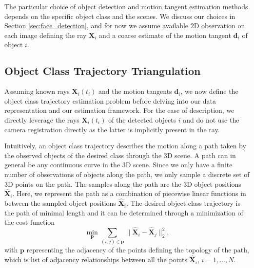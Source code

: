 The particular choice of object detection and motion tangent estimation methods depends on the specific object class and the scenes.
We discuss our choices in Section \ref{sec:face_detection}, and for now we assume available 2D observation on each image defining the ray $\mathbf{X}_i$ and a coarse estimate of the motion tangent $\mathbf{d}_i$ of object $i$.



\subsection{Object Class Trajectory Triangulation}
\label{sec:problem}
Assuming known rays $\mathbf{X}_i(t_i)$ and the motion tangents $\mathbf{d}_{i}$, we now define the object class trajectory estimation problem before delving into our data representation and our estimation framework. For the ease of description, we directly leverage the rays $\mathbf{X}_i(t_i)$ of the detected objects $i$ and do not use the camera registration directly as the latter is implicitly present in the ray.

Intuitively, an object class trajectory describes the motion along a path taken by the observed objects of the desired class through the 3D scene. A path can in general be any continuous curve in the 3D scene. Since we only have a finite number of observations of objects along the path, we only sample a discrete set of 3D points on the path. The samples along the path are the 3D object positions $\mathbf{\hat{X}}_i$. Here, we represent the path as a combination of piecewise linear functions in between the sampled object positions $\mathbf{\hat{X}}_i$.
The desired object class trajectory is the path of minimal length and it can be determined through a minimization of the cost function
\begin{equation}
\label{eq:pathsimple}
\underset{\mathbf{p}} { \min  }\sum_{(i,j)\in\mathbf{p}}{\|\mathbf{\hat{X}}_i-\mathbf{\hat{X}}_j\|_2^2},
\end{equation}
with $\mathbf{p}$ representing the adjacency of the points defining the topology of the path, which is list of adjacency relationships between all the points $\mathbf{\hat{X}}_i$, $i=1, \dots, N$. 

